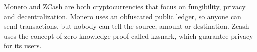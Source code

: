 Monero and ZCash are both cryptocurrencies that focus on fungibility, privacy and decentralization.
Monero uses an obfuscated public ledger, so anyone can send transactions,
but nobody can tell the source, amount or destination.
Zcash uses the concept of zero-knowledge proof called \gls{kzsnark},
which guarantee privacy for its users.
